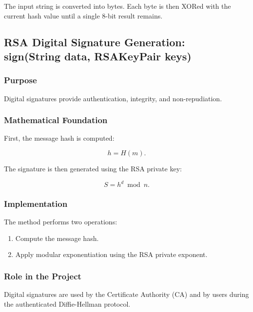 \documentclass[12pt]{article}
\begin{document}
The input string is converted into bytes. Each byte is then XORed with the
current hash value until a single 8-bit result remains.


\subsection{RSA Digital Signature Generation: \\
sign(String data, RSAKeyPair keys)}

\subsubsection{Purpose}

Digital signatures provide authentication, integrity, and non-repudiation.

\subsubsection{Mathematical Foundation}

First, the message hash is computed:

\begin{equation}
h = H(m).
\end{equation}

The signature is then generated using the RSA private key:

\begin{equation}
S = h^d \bmod n.
\end{equation}

\subsubsection{Implementation}

The method performs two operations:

\begin{enumerate}
\item Compute the message hash.
\item Apply modular exponentiation using the RSA private exponent.
\end{enumerate}

\subsubsection{Role in the Project}

Digital signatures are used by the Certificate Authority (CA) and by users
during the authenticated Diffie-Hellman protocol.
\end{document}
